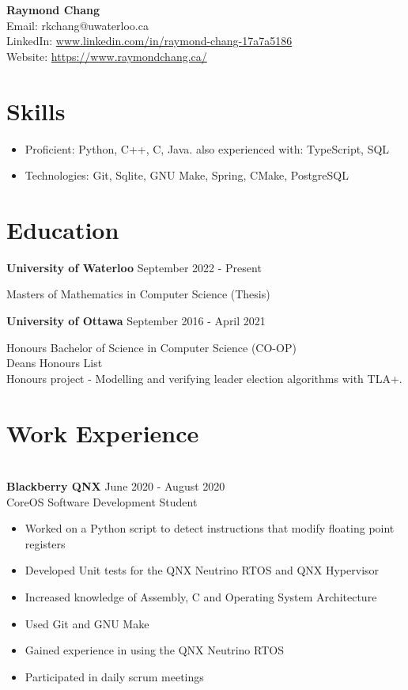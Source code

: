 \documentclass{article}
\begin{document}
\begin{center}
    {\huge\textbf{Raymond Chang}} \\
    Email: rkchang@uwaterloo.ca \\
    LinkedIn: \url{www.linkedin.com/in/raymond-chang-17a7a5186} \\
    Website: \url{https://www.raymondchang.ca/}
\end{center}

\section{Skills} \hrulefill
\begin{itemize}[noitemsep]
    \item Proficient: Python, C++, C, Java. also experienced with: TypeScript, SQL
    \item Technologies: Git, Sqlite, GNU Make, Spring, CMake, PostgreSQL
\end{itemize}

\smallskip

\section{Education} \hrulefill

\textbf{University of Waterloo} \hfill September 2022 - Present

Masters of Mathematics in Computer Science (Thesis)

\hfill

\textbf{University of Ottawa} \hfill September 2016 - April 2021

Honours Bachelor of Science in Computer Science (CO-OP) \\ Deans Honours List \\ Honours project - Modelling and verifying leader election algorithms with TLA+.
\smallskip

\section{Work Experience}

\hrulefill \\
\textbf{Blackberry QNX} \hfill June 2020 - August 2020 \\
CoreOS Software Development Student
\begin{itemize}[noitemsep]
    \item Worked on a Python script to detect instructions that modify floating point registers
    \item Developed Unit tests for the QNX Neutrino RTOS and QNX Hypervisor
    \item Increased knowledge of Assembly, C and Operating System Architecture
    \item Used Git and GNU Make
    \item Gained experience in using the QNX Neutrino RTOS
    \item Participated in daily scrum meetings
\end{itemize}
\end{document}
